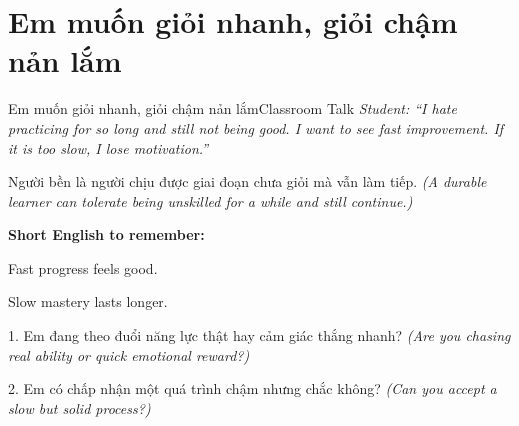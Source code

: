 \section{Em muốn giỏi nhanh, giỏi chậm nản lắm}
\begin{truyen}{Em muốn giỏi nhanh, giỏi chậm nản lắm}{Classroom Talk}
\textit{Student: ``I hate practicing for so long and still not being good. I want to see fast improvement. If it is too slow, I lose motivation.''}\\[4pt]



\end{truyen}

\begin{baihoc}
Người bền là người chịu được giai đoạn chưa giỏi mà vẫn làm tiếp.
\textit{(A durable learner can tolerate being unskilled for a while and still continue.)}
\end{baihoc}

\begin{ghinhoanh}
\textbf{Short English to remember:}

Fast progress feels good.

Slow mastery lasts longer.
\end{ghinhoanh}

\begin{tuhocnhanh}
1. Em đang theo đuổi năng lực thật hay cảm giác thắng nhanh? \textit{(Are you chasing real ability or quick emotional reward?)}

2. Em có chấp nhận một quá trình chậm nhưng chắc không? \textit{(Can you accept a slow but solid process?)}
\end{tuhocnhanh}
\ngancach